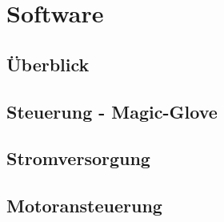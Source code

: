\chapter{Software}

\section{Überblick}
\section{Steuerung - Magic-Glove}
\section{Stromversorgung}
\section{Motoransteuerung}
